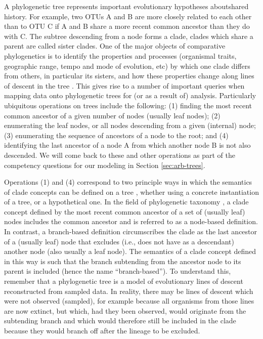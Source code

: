 A phylogenetic tree represents important evolutionary hypotheses about\linebreak[4]
shared history. For example, two OTUs A and B are more closely related
to each other than to OTU C if A and B share a more recent common
ancestor than they do with C. The subtree descending from a node forms
a clade, clades which share a parent are called sister clades. One of
the major objects of comparative phylogenetics is to identify the
properties and processes (organismal traits, geographic range, tempo and mode of
evolution, etc) by which one clade differs from others, in particular
its sisters, and how these properties change along lines of descent in
the tree \cite{Felsenstein1985-au,OMeara2011-br}. This gives rise to a
number of important queries when mapping data onto phylogenetic trees
for (or as a result of) analysis. Particularly ubiquitous operations
on trees include the following: (1) finding the most recent common
ancestor of a given number of nodes (usually leaf nodes); (2)
enumerating the leaf nodes, or all nodes descending from a given
(internal) node; (3) enumerating the sequence of ancestors of a node
to the root; and (4) identifying the last ancestor of a node A from
which another node B is not also descended. We will come back to these and other operations as part of the competency questions for our modeling in Section \ref{sec:arb-trees}.

Operations (1) and (4) correspond to two principle ways in which the
semantics of clade concepts can be defined on a tree
\cite{De_Queiroz1990-bv}, whether using a concrete instantiation of a
tree, or a hypothetical one. In the field of phylogenetic taxonomy
\cite{De_Queiroz1992-oq}, a clade concept defined by the most recent
common ancestor of a set of (usually leaf) nodes includes the common
ancestor and is referred to as a node-based definition. In contrast, a
branch-based definition circumscribes the clade as the last ancestor
of a (usually leaf) node that excludes (i.e., does not have as a
descendant) another node (also usually a leaf node). The semantics of
a clade concept defined in this way is such that the branch subtending
from the ancestor node to its parent is included (hence the name
“branch-based”). To understand this, remember that a phylogenetic tree
is a model of evolutionary lines of descent reconstructed from sampled
data. In reality, there may be lines of descent which were not
observed (sampled), for example because all organisms from those lines
are now extinct, but which, had they been observed, would originate
from the subtending branch and which would therefore still be included
in the clade because they would branch off after the lineage to be
excluded.


